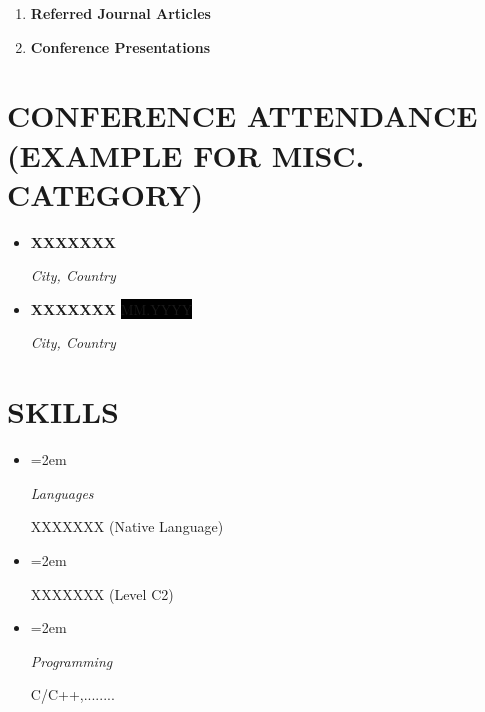 \documentclass[paper=a4,fontsize=11pt]{scrartcl} %
\newlength{\spacebox}
\newcommand{\sepspace}{\vspace*{1em}}		%
\newcommand{\NewPart}[1]{\section*{\uppercase{#1}}}
\newcommand{\PersonalEntry}[2]{
		\noindent\hangindent=2em\hangafter=0 %
		\parbox{1.2\spacebox}{        %
		\textit{#1}}		       %
		\hspace{1.5em} #2 \par}    %
\newcommand{\SkillsEntry}[2]{      %
		\noindent\hangindent=2em\hangafter=0 %
		\parbox{1.2\spacebox}{        %
		\textit{#1}}			   %
		\hspace{1.5em} #2 \par}    %
\newcommand{\MiscEntry}[2]{
		\noindent \textbf{#1} \par      %
		\noindent \textit{#2} \par              %
		\normalsize \par}
\newcommand{\MiscEntryDate}[3]{
		\noindent \textbf{#1} \hfill      %
		\colorbox{Black}{\color{White}#2} \par  %
		\noindent \textit{#3} \par              %
		\normalsize \par}
\begin{document}
\begin{enumerate}[label=\textbf{\Alph*.},leftmargin=*]
    \item   \textbf{Referred Journal Articles}
            \begin{refsection}
            \nocite{*}
            \printbibliography[heading=none]
            \end{refsection}
    \item   \textbf{Conference Presentations}
            \begin{refsection}
            \nocite{*}
            \printbibliography[heading=none]
            \end{refsection}
\end{enumerate}





\NewPart{Conference Attendance (Example for Misc. Category)}

\begin{itemize}[leftmargin=*]
    \item \MiscEntry{XXXXXXX}{City, Country}
    \item \MiscEntryDate{XXXXXXX}{\footnotesize MM.YYYY}{City, Country}
\end{itemize}
\sepspace





\NewPart{Skills}

\begin{itemize}
    \item[] \SkillsEntry{Languages}{XXXXXXX (Native Language)}
    \item[] \SkillsEntry{}{XXXXXXX (Level C2)}
    \item[] \SkillsEntry{Programming}{\textsc{C/C++},........}
\end{itemize}
\sepspace
\end{document}
